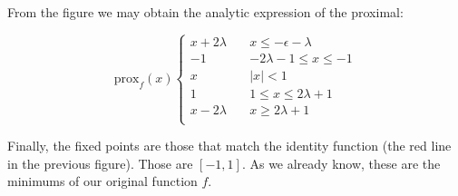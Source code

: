 \documentclass[11pt,table]{article}
\begin{document}
	From the figure we may obtain the analytic expression of the proximal:
	
	\[
	\text{prox}_f(x) \begin{cases}
		x + 2\lambda \quad & x \le -\epsilon-\lambda \\
		-1 \quad &  -2\lambda-1 \le x \le -1 \\
		x \quad & |x| < 1 \\
		1 \quad & 1 \le x \le 2\lambda + 1 \\
		x-2\lambda \quad & x \ge 2\lambda + 1 \\
	\end{cases}
	\]
	
	Finally, the fixed points are those that match the identity function (the red line in the previous figure). Those are $[-1,1]$. As we already know, these are the minimums of our original function $f$.
	
\end{document}
